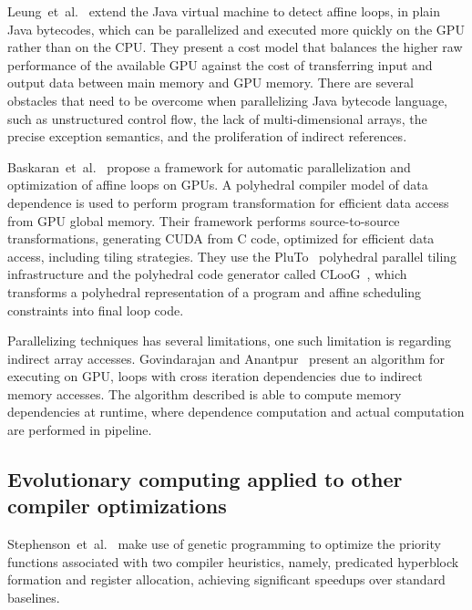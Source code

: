 \documentclass[a4paper,12pt]{article}
\newcommand{\etal}{et~al.}
\begin{document}
Leung~\etal~\cite{leung09} extend the Java virtual machine to detect affine
loops, in plain Java bytecodes, which can be parallelized and executed more
quickly on the GPU rather than on the CPU.  They present a cost model that
balances the higher raw performance of the available GPU against the cost of
transferring input and output data between main memory and GPU memory.  There
are several obstacles that need to be overcome when parallelizing Java bytecode
language, such as unstructured control flow, the lack of multi-dimensional
arrays, the precise exception semantics, and the proliferation of indirect
references.

Baskaran~\etal~\cite{baskaran08,baskaran10} propose a framework for automatic
parallelization and optimization of affine loops on GPUs. A polyhedral compiler
model of data dependence is used to perform program transformation for
efficient data access from GPU global memory.  Their framework performs
source-to-source transformations, generating CUDA from C code, optimized for
efficient data access, including tiling strategies.  They use the
PluTo~\cite{bondhugula08} polyhedral parallel tiling infrastructure and the
polyhedral code generator called CLooG~\cite{bastoul04}, which transforms a
polyhedral representation of a program and affine scheduling constraints into
final loop code.

Parallelizing techniques has several limitations, one such limitation is
regarding indirect array accesses.  Govindarajan and
Anantpur~\cite{govindarajan13} present an algorithm for executing on GPU, loops
with cross iteration dependencies due to indirect memory accesses.  The
algorithm described is able to compute memory dependencies at runtime, where
dependence computation and actual computation are performed in pipeline.

\subsection{Evolutionary computing applied to other compiler optimizations}

Stephenson~\etal~\cite{stephenson03} make use of genetic programming to
optimize the priority functions associated with two compiler heuristics,
namely, predicated hyperblock formation and register allocation, achieving
significant speedups over standard baselines.
\end{document}
